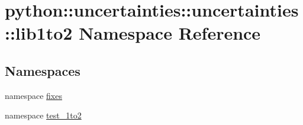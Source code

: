 \hypertarget{namespacepython_1_1uncertainties_1_1uncertainties_1_1lib1to2}{
\section{python::uncertainties::uncertainties::lib1to2 Namespace Reference}
\label{namespacepython_1_1uncertainties_1_1uncertainties_1_1lib1to2}
}
\subsection*{Namespaces}
\begin{DoxyCompactItemize}
\item 
namespace \hyperlink{namespacepython_1_1uncertainties_1_1uncertainties_1_1lib1to2_1_1fixes}{fixes}
\item 
namespace \hyperlink{namespacepython_1_1uncertainties_1_1uncertainties_1_1lib1to2_1_1test__1to2}{test\_\-1to2}
\end{DoxyCompactItemize}
